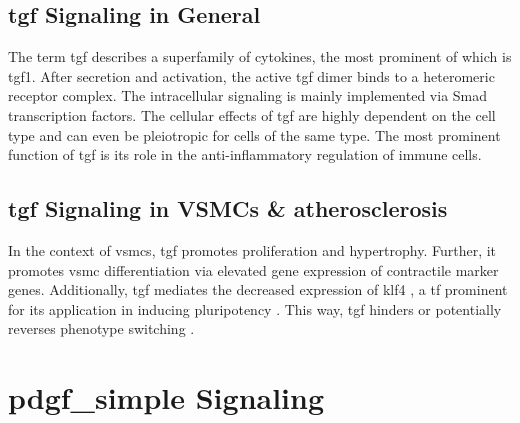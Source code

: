     \subsection{\ac{tgf} Signaling in General}
    \label{subsec:tgf_the_cytokine}
    The term \acf{tgf} describes a superfamily of cytokines, the most prominent of which is \ac{tgf}1. After secretion and activation, the active \ac{tgf} dimer binds to a heteromeric receptor complex. The intracellular signaling is mainly implemented via Smad transcription factors. The cellular effects of \ac{tgf} are highly dependent on the cell type and can even be pleiotropic for cells of the same type. The most prominent function of \ac{tgf} is its role in the anti-inflammatory regulation of immune cells. \cite{goumansTGFvSignalingControl2018, batlleTransformingGrowthFactorv2019}

    \subsection{\ac{tgf} Signaling in VSMCs \& atherosclerosis}
    \label{subsec:pdf_signaling}
    In the context of \acp{vsmc}, \ac{tgf} promotes proliferation and hypertrophy. Further, it promotes \ac{vsmc} differentiation via elevated gene expression of contractile marker genes. Additionally, \ac{tgf} mediates the decreased expression of \ac{klf4} \cite{davis-dusenberyDownregulationKruppellikeFactor42011}, a \ac{tf} prominent for its application in inducing pluripotency \cite{takahashiInductionPluripotentStem2007}. This way, \ac{tgf} hinders \cite{davis-dusenberyDownregulationKruppellikeFactor42011} or potentially reverses phenotype switching \cite{panSingleCellGenomicsReveals2020}.

\section{\ac{pdgf_simple} Signaling}
\label{sec:pdgf}

